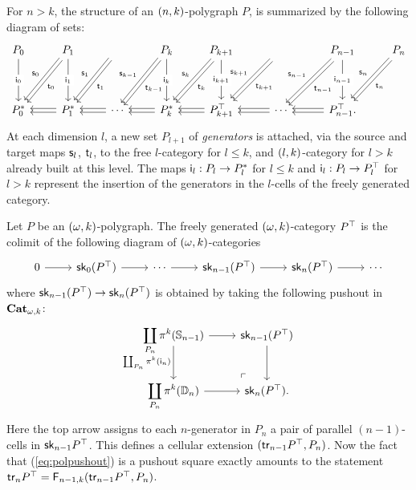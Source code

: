 \begin{paragr}\label{paragr:okpol}
  For $n>k$, the structure of an $(n,k)$-polygraph $P$,  is
  summarized by the following diagram of sets:
  \[
  \begin{tikzcd}[row sep=huge]
    P_0\ar[d,"\gni 0" description]&P_1\ar[d,"\gni
    1" description]\tdouble{ld}{"\sce 0"'}{"\tge 0"}&\phantom{P_2}\tdouble{ld}{"\sce
      1"'}{"\tge 1"}&P_k\ar[d,"\gni{k}"
    description]\tdouble{ld}{"\sce{k-1}"'}{"\tge{k-1}"}&P_{k+1}\ar[d,"\gni{k+1}"
    description]\tdouble{ld}{"\sce k"'}{"\tge
      k"}&\phantom{P_{k+2}}\tdouble{ld}{"\sce{k+1}"'}{"\tge{k+1}"}&P_{n-1}\ar[d,"\gni{n-1}"
    description]\tdouble{ld}{"\sce{n-1}"'}{"\tge{n-1}"}&P_n\tdouble{ld}{"\sce n"'}{"\tge n"}\\
    \frcat P_0&\frcat P_1\tdouble{l}{""}{""}&\cdots\tdouble{l}{""}{""}&\frcat P_k\tdouble{l}{""}{""}&\frgp
    P_{k+1}\tdouble{l}{""}{""}&\cdots\tdouble{l}{""}{""}&\frgp P_{n-1}\tdouble{l}{""}{""}.&
  \end{tikzcd}
  \]
  At each dimension $l$, a new set $P_{l+1}$ of {\em generators} is
  attached, via the source and target maps $\mathsf{s}_{l}$, $\mathsf{t}_{l}$, to the free
  $l$-category for $l\leq k$, and  $(l,k)$-category for $l>k$ already built at this level.  The
  maps $\mathsf{i}_{l}:P_l\to P^*_l$ for $l\leq k$ and $\mathsf{i}_{l}:P_l\to
  P^\top_l$ for $l>k$ represent the insertion of the generators in
  the $l$-cells of the freely generated category.
\end{paragr}
\begin{paragr}\label{paragr:opolpushout}
  Let $P$ be an $(\omega,k)$-polygraph. The freely generated $(\omega,k)$-category $P^\top$ is the colimit of the following diagram of
  $(\omega,k)$-categories
  \[
    \begin{tikzcd}
      0\ar[r]&\skl 0(\frgp P)\ar[r] & \cdots\ar[r] &\skl{n-1}(\frgp
      P)\ar[r] &\skl n(\frgp P)\ar[r]&\cdots
    \end{tikzcd}
    \]
  where $\mathsf{sk}_{n-1}(P^\top)\to\mathsf{sk}_{n}(P^\top)$ is
  obtained by taking the following pushout in $\mathbf{Cat}_{\omega,k}$:
  \begin{equation}
    \label{eq:polpushout}
    \begin{tikzcd}
      \displaystyle\coprod_{P_{n}} \opifun k (\Sph{n-1})
     \ar[d,"\coprod_{P_{n}}\opifun k(\gcof {n})"',start anchor={[yshift=2.6ex]},end anchor={[yshift=-0.25ex]}]\ar[r]& \skl{n-1}(\frgp P\ar[d])\\
      \displaystyle\coprod_{P_{n}}\opifun k(\Dsk{n})\ar[r]& \skl
      n(\frgp P).
      \ar[from=1-1,to=2-2,phantom,"\ulcorner",very near end]
    \end{tikzcd}
  \end{equation}
  Here the top arrow assigns to each $n$\nbd-generator in $P_n$ a pair of parallel $(n{-}1)$-cells in
  $\mathsf{sk}_{n-1}P^\top$. This defines a cellular extension 
  $(\mathsf{tr}_{n-1}P^\top,P_n)$.  Now the fact that
  (\ref{eq:polpushout}) is a pushout square exactly amounts to the statement $\mathsf{tr}_{n}P^\top=\mathsf{F}_{n-1,k}(\mathsf{tr}_{n-1}P^\top,P_n)$.
\end{paragr}

